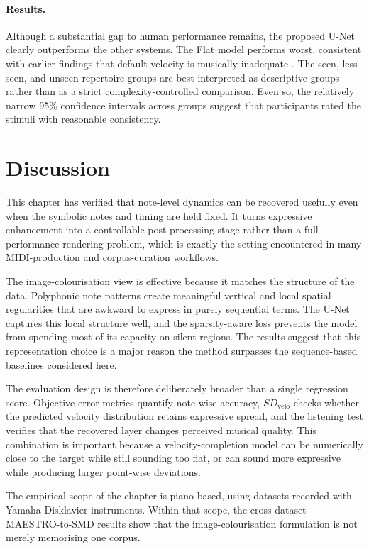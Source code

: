 \paragraph{Results.}
Although a substantial gap to human performance remains, the proposed U-Net clearly outperforms the other systems.
The Flat model performs worst, consistent with earlier findings that default velocity is musically inadequate \cite{kuo2021velocity}.
The seen, less-seen, and unseen repertoire groups are best interpreted as descriptive groups rather than as a strict complexity-controlled comparison.
Even so, the relatively narrow 95\% confidence intervals across groups suggest that participants rated the stimuli with reasonable consistency.

\section{Discussion}
\label{sec:velcomp:discussion}

This chapter has verified that note-level dynamics can be recovered usefully even when the symbolic notes and timing are held fixed. It turns expressive enhancement into a controllable post-processing stage rather than a full performance-rendering problem, which is exactly the setting encountered in many MIDI-production and corpus-curation workflows.

The image-colourisation view is effective because it matches the structure of the data. Polyphonic note patterns create meaningful vertical and local spatial regularities that are awkward to express in purely sequential terms. The U-Net captures this local structure well, and the sparsity-aware loss prevents the model from spending most of its capacity on silent regions. The results suggest that this representation choice is a major reason the method surpasses the sequence-based baselines considered here.

The evaluation design is therefore deliberately broader than a single regression score. Objective error metrics quantify note-wise accuracy, \(SD_{\mathrm{velo}}\) checks whether the predicted velocity distribution retains expressive spread, and the listening test verifies that the recovered layer changes perceived musical quality. This combination is important because a velocity-completion model can be numerically close to the target while still sounding too flat, or can sound more expressive while producing larger point-wise deviations.

The empirical scope of the chapter is piano-based, using datasets recorded with Yamaha Disklavier instruments.
Within that scope, the cross-dataset MAESTRO-to-SMD results show that the image-colourisation formulation is not merely memorising one corpus.


